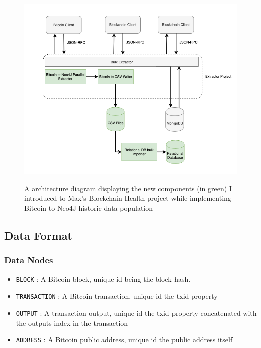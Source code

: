\begin{figure}[h!]
  \centering
  \includegraphics[width = 15cm]{./figures/adding-bitcoin-extractor-diagram}\\[0.5cm] 
  \caption{A architecture diagram displaying the new components (in green) I introduced to Max's Blockchain Health project while implementing Bitcoin to Neo4J historic data population}
  \label{fig:neo4j-layout}
\end{figure}


\subsection{Data Format}

\subsubsection{Data Nodes}
\begin{itemize}
    \item \texttt{BLOCK} : A Bitcoin block, unique id being the block hash. 
    \item \texttt{TRANSACTION} : A Bitcoin transaction, unique id the txid property
    \item \texttt{OUTPUT} : A transaction output, unique id the txid property concatenated with the outputs index in the transaction
    \item \texttt{ADDRESS} : A Bitcoin public address, unique id the public address itself
\end{itemize}

